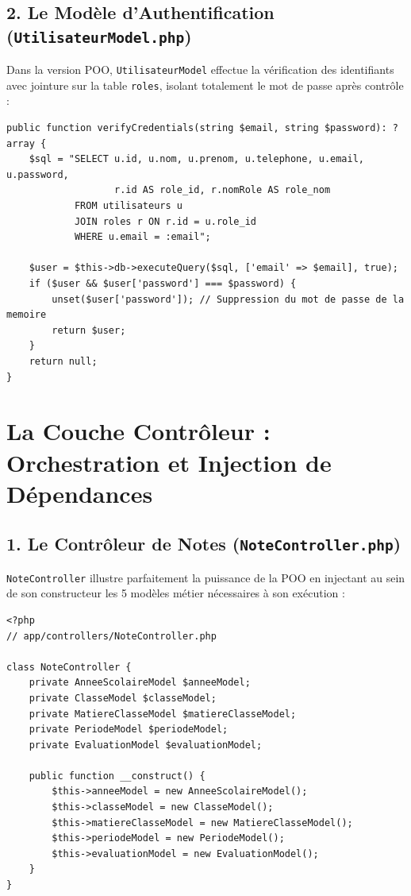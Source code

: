 \documentclass[11pt,a4paper,oneside]{report}
\begin{document}
\subsection{2. Le Modèle d'Authentification (\texttt{UtilisateurModel.php})}
Dans la version POO, \texttt{UtilisateurModel} effectue la vérification des identifiants avec jointure sur la table \texttt{roles}, isolant totalement le mot de passe après contrôle :

\begin{lstlisting}[language=PHP8, caption={Vérification des identifiants au sein d'UtilisateurModel}]
public function verifyCredentials(string $email, string $password): ?array {
    $sql = "SELECT u.id, u.nom, u.prenom, u.telephone, u.email, u.password,
                   r.id AS role_id, r.nomRole AS role_nom
            FROM utilisateurs u
            JOIN roles r ON r.id = u.role_id
            WHERE u.email = :email";

    $user = $this->db->executeQuery($sql, ['email' => $email], true);
    if ($user && $user['password'] === $password) {
        unset($user['password']); // Suppression du mot de passe de la memoire
        return $user;
    }
    return null;
}
\end{lstlisting}

\section{La Couche Contrôleur : Orchestration et Injection de Dépendances}

\subsection{1. Le Contrôleur de Notes (\texttt{NoteController.php})}
\texttt{NoteController} illustre parfaitement la puissance de la POO en injectant au sein de son constructeur les 5 modèles métier nécessaires à son exécution :

\begin{lstlisting}[language=PHP8, caption={Constructeur et injection de dépendances dans NoteController}]
<?php
// app/controllers/NoteController.php

class NoteController {
    private AnneeScolaireModel $anneeModel;
    private ClasseModel $classeModel;
    private MatiereClasseModel $matiereClasseModel;
    private PeriodeModel $periodeModel;
    private EvaluationModel $evaluationModel;

    public function __construct() {
        $this->anneeModel = new AnneeScolaireModel();
        $this->classeModel = new ClasseModel();
        $this->matiereClasseModel = new MatiereClasseModel();
        $this->periodeModel = new PeriodeModel();
        $this->evaluationModel = new EvaluationModel();
    }
}
\end{lstlisting}
\end{document}
